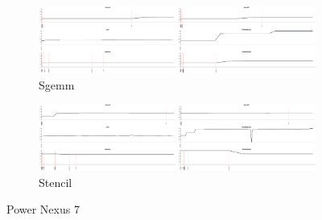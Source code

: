 \begin{figure}[ht]
  \begin{subfigure}[b]{0.95\textwidth}
      \centering
      \includegraphics[width=\textwidth]{data/power_sgemm_nexus7.pdf}
      \caption{Sgemm}\label{fig:Sgemm}
  \end{subfigure}
  \begin{subfigure}[b]{0.95\textwidth}
      \centering
      \includegraphics[width=\textwidth]{data/power_stencil_nexus7.pdf}
      \caption{Stencil}
      \label{fig:Stencil}
  \end{subfigure}

\caption{Power Nexus 7}
\end{figure}



